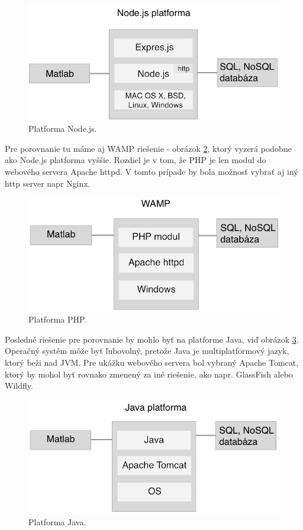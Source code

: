 \begin{figure}[H]
  \centering
  \includegraphics[scale=0.6]{img/platf/node-platform.png}
  \caption{Platforma Node.js.}
  \label{img-plat-node}
\end{figure}

Pre porovnanie tu máme aj WAMP riešenie - obrázok \ref{img-plat-php}, ktorý vyzerá podobne ako Node.js platforma vyššie. Rozdiel je v tom, že PHP je len modul do webového servera Apache httpd. V tomto prípade by bola možnosť vybrať aj iný http server napr Nginx.

\begin{figure}[H]
  \centering
  \includegraphics[scale=0.6]{img/platf/php-platform.png}
  \caption{Platforma PHP.}
  \label{img-plat-php}
\end{figure}

Posledné riešenie pre porovnanie by mohlo byť na platforme Java, viď obrázok \ref{img-plat-java}. Operačný systém môže byť ľubovolný, pretože Java je multiplatformový jazyk, ktorý beži nad JVM. Pre ukážku webového servera bol vybraný Apache Tomcat, ktorý by mohol byť rovnako zmenený za iné riešenie, ako napr. GlassFish alebo Wildfly.

\begin{figure}[H]
  \centering
  \includegraphics[scale=0.6]{img/platf/java-platform.png}
  \caption{Platforma Java.}
  \label{img-plat-java}
\end{figure}

